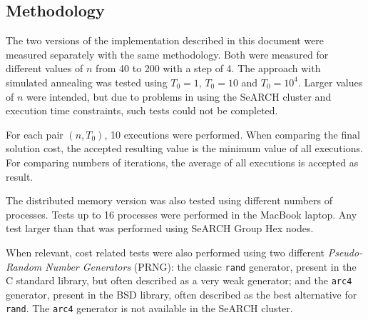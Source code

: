\subsection{Methodology}
\label{sec:methodology}

The two versions of the implementation described in this document were measured separately with the same methodology. Both were measured for different values of $n$ from 40 to 200 with a step of 4. The approach with simulated annealing was tested using $T_{0}=1$, $T_{0}=10$ and $T_{0}=10^{4}$. Larger values of $n$ were intended, but due to problems in using the SeARCH cluster and execution time constraints, such tests could not be completed.

For each pair $(n,T_{0})$, 10 executions were performed. When comparing the final solution cost, the accepted resulting value is the minimum value of all executions. For comparing numbers of iterations, the average of all executions is accepted as result.

The distributed memory version was also tested using different numbers of processes. Tests up to 16 processes were performed in the MacBook laptop. Any test larger than that was performed using SeARCH Group Hex nodes.

When relevant, cost related tests were also performed using two different \textit{Pseudo-Random Number Generators} (PRNG): the classic \texttt{rand} generator, present in the C standard library, but often described as a very weak generator; and the \texttt{arc4} generator, present in the BSD library, often described as the best alternative for \texttt{rand}. The \texttt{arc4} generator is not available in the SeARCH cluster.
